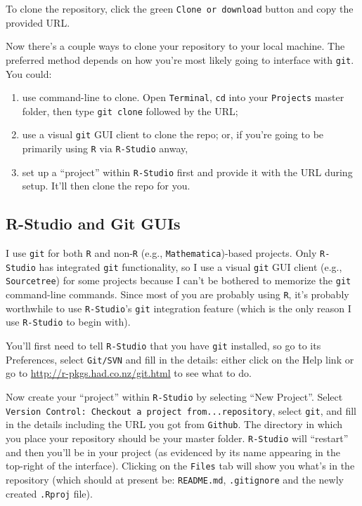 \documentclass[12pt,letterpaper]{article}
\begin{document}
To clone the repository, click the green \texttt{Clone or download} button and copy the provided URL.

Now there's a couple ways to clone your repository to your local machine.  The preferred method depends on how you're most likely going to interface with \texttt{git}.  You could:
\begin{enumerate}
	\item use command-line to clone.  Open \texttt{Terminal}, \texttt{cd} into your \texttt{Projects} master folder, then type \texttt{git clone} followed by the URL;
	\item use a visual \texttt{git} GUI client to clone the repo;
	or, if you're going to be primarily using \texttt{R} via \texttt{R-Studio} anway,
	\item set up a ``project'' within \texttt{R-Studio} first and provide it with the URL during setup.  It'll then clone the repo for you.
\end{enumerate} 

\subsection{R-Studio and Git GUIs}
I use \texttt{git} for both \texttt{R} and non-\texttt{R} (e.g.,  \texttt{Mathematica})-based projects.  Only  \texttt{R-Studio} has integrated  \texttt{git} functionality, so I use a visual  \texttt{git} GUI client (e.g., \texttt{Sourcetree}) for some projects because I can't be bothered to memorize the  \texttt{git} command-line commands.  Since most of you are probably using \texttt{R}, it's probably worthwhile to use \texttt{R-Studio}'s  \texttt{git} integration feature (which is the only reason I use  \texttt{R-Studio} to begin with).

You'll first need to tell  \texttt{R-Studio} that you have \texttt{git} installed, so go to its Preferences, select \texttt{Git/SVN} and fill in the details: either click on the Help link or go to 
\url{http://r-pkgs.had.co.nz/git.html} to see what to do.

Now create your ``project'' within  \texttt{R-Studio} by selecting ``New Project''.  Select \texttt{Version Control: Checkout a project from...repository}, select \texttt{git}, and fill in the details including the URL you got from \texttt{Github}.  The directory in which you place your repository should be your master folder.   \texttt{R-Studio} will ``restart'' and then you'll be in your project (as evidenced by its name appearing in the top-right of the interface).  Clicking on the \texttt{Files} tab will show you what's in the repository (which should at present be: \texttt{README.md}, \texttt{.gitignore} and the newly created \texttt{.Rproj} file).
\end{document}
